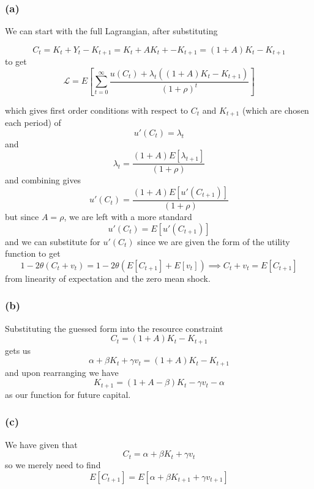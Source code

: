 \documentclass[11pt]{amsart}
\begin{document}
\subsubsection*{(a)}

We can start with the full Lagrangian, after substituting

\[
C_t = K_t + Y_t - K_{t+1} =  K_t + A K_t + - K_{t+1}  = (1 + A) K_t - K_{t+1}
\]
to get
\[
\mathcal{L} = E \left[ \sum_{t=0}^{\infty} \frac{u(C_t) + \lambda_t ((1 + A) K_t - K_{t+1})}{(1+\rho)^t} \right]
\]

which gives first order conditions with respect to $C_t$ and $K_{t+1}$ (which are chosen each period) of
\[
u'(C_t) = \lambda_t
\]
and
\[
\lambda_t = \frac{(1+A) E[\lambda_{t+1}]}{(1+\rho)}
\]
and combining gives
\[
u'(C_t) = \frac{(1+A) E[u'(C_{t+1})]}{(1+\rho)}
\]
but since $A=\rho$, we are left with a more standard
\[
u'(C_t) = E[u'(C_{t+1})]
\]
and we can substitute for $u'(C_t)$ since we are given the form of the utility function to get
\[
1 - 2 \theta (C_t + v_t) = 1 - 2 \theta (E[C_{t+1}] + E[v_t]) \implies C_t + v_t = E[C_{t+1}]
\]
from linearity of expectation and the zero mean shock.

\subsubsection*{(b)}

Substituting the guessed form into the resource constraint
\[
C_t = (1 + A) K_t - K_{t+1}
\]
gets us
\[
\alpha + \beta K_t + \gamma v_t = (1 + A) K_t - K_{t+1}
\]
and upon rearranging we have
\[
K_{t+1} = (1 + A - \beta) K_t - \gamma v_t - \alpha
\]
as our function for future capital.

\subsubsection*{(c)}

We have given that
\[
C_t = \alpha + \beta K_t + \gamma v_t
\]
so we merely need to find
\[
E[C_{t+1}] = E[\alpha + \beta K_{t+1} + \gamma v_{t+1}]
\]
\end{document}
